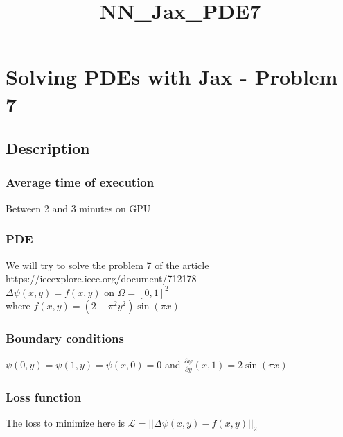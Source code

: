 \documentclass[11pt]{article}
\title{NN\_Jax\_PDE7}
\begin{document}
    
    \maketitle
    
    

    
    \hypertarget{solving-pdes-with-jax---problem-7}{%
\section{Solving PDEs with Jax - Problem
7}\label{solving-pdes-with-jax---problem-7}}

\hypertarget{description}{%
\subsection{Description}\label{description}}

\hypertarget{average-time-of-execution}{%
\subsubsection{Average time of
execution}\label{average-time-of-execution}}

Between 2 and 3 minutes on GPU

\hypertarget{pde}{%
\subsubsection{PDE}\label{pde}}

We will try to solve the problem 7 of the article
https://ieeexplore.ieee.org/document/712178\\
\(\Delta \psi(x,y) = f(x,y)\) on \(\Omega = [0,1]^2\)\\
where \(f(x, y)=(2-\pi^2y^2)\sin(\pi x)\)

\hypertarget{boundary-conditions}{%
\subsubsection{Boundary conditions}\label{boundary-conditions}}

\(\psi(0,y)=\psi(1,y)=\psi(x,0)=0\) and
\(\frac{\partial \psi}{\partial y}(x,1)=2\sin(\pi x)\)

\hypertarget{loss-function}{%
\subsubsection{Loss function}\label{loss-function}}

The loss to minimize here is
\(\mathcal{L} = ||\Delta \psi(x,y)-f(x,y) ||_2\)
\end{document}
